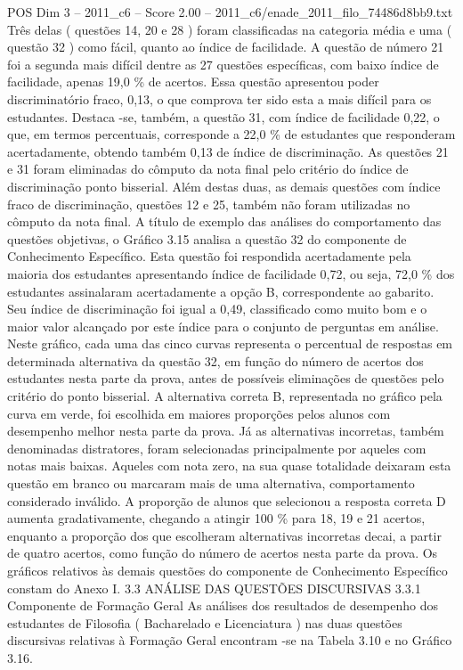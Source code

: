 \begin{textsample}{POS Dim 3 – 2011\_c6 – Score 2.00 – 2011\_c6/enade\_2011\_filo\_74486d8bb9.txt}
Três delas ( questões 14, 20 e 28 ) foram classificadas na categoria média e uma ( questão 32 ) como fácil, quanto ao índice de facilidade.
A questão de número 21 foi a segunda mais difícil dentre as 27 questões específicas, com baixo índice de facilidade, apenas 19,0 \% de acertos.
Essa questão apresentou poder discriminatório fraco, 0,13, o que comprova ter sido esta a mais difícil para os estudantes.
Destaca -se, também, a questão 31, com índice de facilidade 0,22, o que, em termos percentuais, corresponde a 22,0 \% de estudantes que responderam acertadamente, obtendo também 0,13 de índice de discriminação.
As questões 21 e 31 foram eliminadas do cômputo da nota final pelo critério do índice de discriminação ponto bisserial.
Além destas duas, as demais questões com índice fraco de discriminação, questões 12 e 25, também não foram utilizadas no cômputo da nota final.
A título de exemplo das análises do comportamento das questões objetivas, o Gráfico 3.15 analisa a questão 32 do componente de Conhecimento Específico.
Esta questão foi respondida acertadamente pela maioria dos estudantes apresentando índice de facilidade 0,72, ou seja, 72,0 \% dos estudantes assinalaram acertadamente a opção B, correspondente ao gabarito.
Seu índice de discriminação foi igual a 0,49, classificado como muito bom e o maior valor alcançado por este índice para o conjunto de perguntas em análise.
Neste gráfico, cada uma das cinco curvas representa o percentual de respostas em determinada alternativa da questão 32, em função do número de acertos dos estudantes nesta parte da prova, antes de possíveis eliminações de questões pelo critério do ponto bisserial.
A alternativa correta B, representada no gráfico pela curva em verde, foi escolhida em maiores proporções pelos alunos com desempenho melhor nesta parte da prova.
Já as alternativas incorretas, também denominadas distratores, foram selecionadas principalmente por aqueles com notas mais baixas.
Aqueles com nota zero, na sua quase totalidade deixaram esta questão em branco ou marcaram mais de uma alternativa, comportamento considerado inválido.
A proporção de alunos que selecionou a resposta correta D aumenta gradativamente, chegando a atingir 100 \% para 18, 19 e 21 acertos, enquanto a proporção dos que escolheram alternativas incorretas decai, a partir de quatro acertos, como função do número de acertos nesta parte da prova.
Os gráficos relativos às demais questões do componente de Conhecimento Específico constam do Anexo I. 3.3 ANÁLISE DAS QUESTÕES DISCURSIVAS 3.3.1 Componente de Formação Geral As análises dos resultados de desempenho dos estudantes de Filosofia ( Bacharelado e Licenciatura ) nas duas questões discursivas relativas à Formação Geral encontram -se na Tabela 3.10 e no Gráfico 3.16.

\end{textsample}
